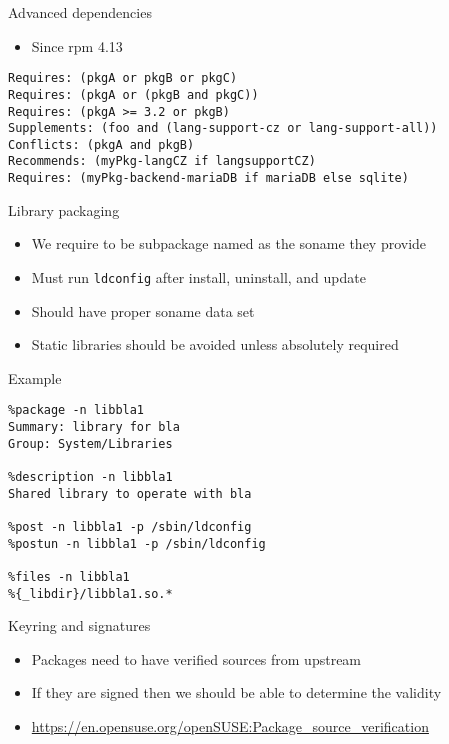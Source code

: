 \documentclass{beamer}
\begin{document}
\begin{frame}[fragile]{Advanced dependencies}
  \begin{itemize}
    \item Since rpm 4.13
  \end{itemize}
  \begin{small}
 \begin{verbatim}
Requires: (pkgA or pkgB or pkgC)
Requires: (pkgA or (pkgB and pkgC))
Requires: (pkgA >= 3.2 or pkgB)
Supplements: (foo and (lang-support-cz or lang-support-all))
Conflicts: (pkgA and pkgB)
Recommends: (myPkg-langCZ if langsupportCZ)
Requires: (myPkg-backend-mariaDB if mariaDB else sqlite)
\end{verbatim}
	\end{small}
\end{frame}

\begin{frame}[t]{Library packaging}
	\begin{itemize}
	\item We require to be subpackage named as the soname they provide
    \item Must run \texttt{ldconfig} after install, uninstall, and update
    \item Should have proper soname data set
    \item Static libraries should be avoided unless absolutely required
	\end{itemize}
\end{frame}

\begin{frame}[fragile]{Example}
	\begin{small}
\begin{verbatim}
%package -n libbla1
Summary: library for bla
Group: System/Libraries

%description -n libbla1
Shared library to operate with bla

%post -n libbla1 -p /sbin/ldconfig
%postun -n libbla1 -p /sbin/ldconfig

%files -n libbla1
%{_libdir}/libbla1.so.*
\end{verbatim}
	\end{small}
\end{frame}

\begin{frame}[t]{Keyring and signatures}
	\begin{itemize}
	\item Packages need to have verified sources from upstream
	\item If they are signed then we should be able to determine the validity
	\item \url{https://en.opensuse.org/openSUSE:Package\_source\_verification}
	\end{itemize}
\end{frame}
\end{document}
